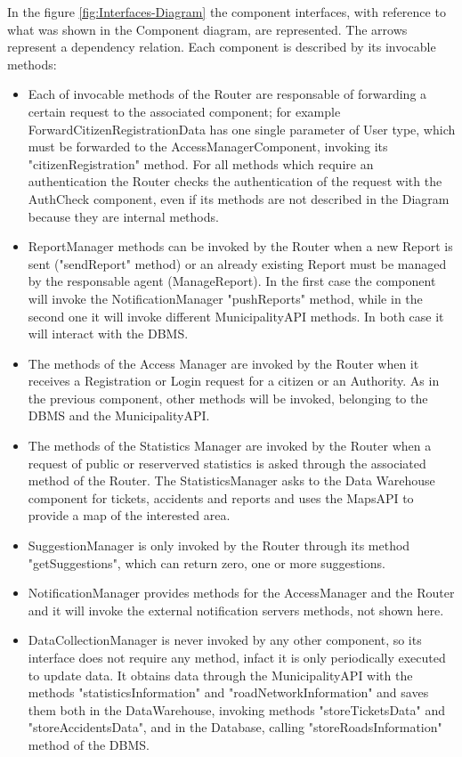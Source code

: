 \documentclass[a4paper]{report}
\begin{document}
In the figure \ref{fig:Interfaces-Diagram} the component interfaces, with reference to what was shown in the Component diagram, are represented. The arrows represent a dependency relation. Each component is described by its invocable methods:
\begin{itemize}
\item Each of invocable methods of the Router are responsable of forwarding a certain request to the associated component; for example ForwardCitizenRegistrationData has one single parameter of User type, which must be forwarded to the AccessManagerComponent, invoking its "citizenRegistration" method.
For all methods which require an authentication the Router checks the authentication of the request with the AuthCheck component, even if its methods are not described in the Diagram because they are internal methods.
\item ReportManager methods can be invoked by the Router when a new Report is sent ("sendReport" method) or an already existing Report must be managed by the responsable agent (ManageReport). In the first case the component will invoke the NotificationManager "pushReports" method, while in the second one it will invoke different MunicipalityAPI methods. In both case it will interact with the DBMS.
\item The methods of the Access Manager are invoked by the Router when it receives a Registration or Login request for a citizen or an Authority. As in the previous component, other methods will be invoked, belonging to the DBMS and the MunicipalityAPI.
\item The methods of the Statistics Manager are invoked by the Router when a request of public or reserverved statistics is asked through the associated method of the Router. The StatisticsManager asks to the Data Warehouse component for tickets, accidents and reports and uses the MapsAPI to provide a map of the interested area.
\item SuggestionManager is only invoked by the Router through its method "getSuggestions", which can return zero, one or more suggestions.
\item NotificationManager provides methods for the AccessManager and the Router and it will invoke the external notification servers methods, not shown here.
\item DataCollectionManager is never invoked by any other component, so its interface does not require any method, infact it is only periodically executed to update data. It obtains data through the MunicipalityAPI with the methods "statisticsInformation" and "roadNetworkInformation" and saves them both in the DataWarehouse, invoking methods "storeTicketsData" and "storeAccidentsData", and in the Database, calling "storeRoadsInformation" method of the DBMS.

\end{itemize}
\end{document}
